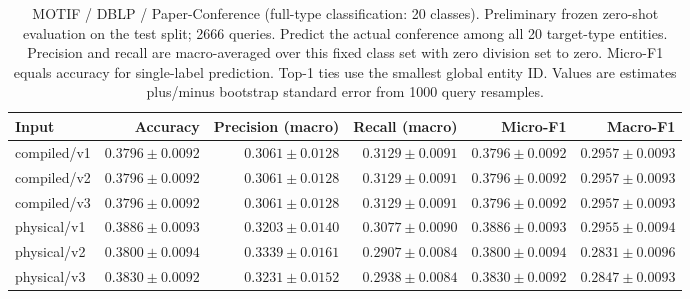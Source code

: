 \begin{table}[t]
\centering
\small
\begin{tabular}{lrrrrr}
\toprule
Input & Accuracy & Precision (macro) & Recall (macro) & Micro-F1 & Macro-F1 \\
\midrule
compiled/v1 & $0.3796 \pm 0.0092$ & $0.3061 \pm 0.0128$ & $0.3129 \pm 0.0091$ & $0.3796 \pm 0.0092$ & $0.2957 \pm 0.0093$ \\
compiled/v2 & $0.3796 \pm 0.0092$ & $0.3061 \pm 0.0128$ & $0.3129 \pm 0.0091$ & $0.3796 \pm 0.0092$ & $0.2957 \pm 0.0093$ \\
compiled/v3 & $0.3796 \pm 0.0092$ & $0.3061 \pm 0.0128$ & $0.3129 \pm 0.0091$ & $0.3796 \pm 0.0092$ & $0.2957 \pm 0.0093$ \\
physical/v1 & $0.3886 \pm 0.0093$ & $0.3203 \pm 0.0140$ & $0.3077 \pm 0.0090$ & $0.3886 \pm 0.0093$ & $0.2955 \pm 0.0094$ \\
physical/v2 & $0.3800 \pm 0.0094$ & $0.3339 \pm 0.0161$ & $0.2907 \pm 0.0084$ & $0.3800 \pm 0.0094$ & $0.2831 \pm 0.0096$ \\
physical/v3 & $0.3830 \pm 0.0092$ & $0.3231 \pm 0.0152$ & $0.2938 \pm 0.0084$ & $0.3830 \pm 0.0092$ & $0.2847 \pm 0.0093$ \\
\bottomrule
\end{tabular}
\caption{MOTIF / DBLP / Paper-Conference (full-type classification: 20 classes). Preliminary frozen zero-shot evaluation on the test split; 2666 queries. Predict the actual conference among all 20 target-type entities. Precision and recall are macro-averaged over this fixed class set with zero division set to zero. Micro-F1 equals accuracy for single-label prediction. Top-1 ties use the smallest global entity ID. Values are estimates plus/minus bootstrap standard error from 1000 query resamples.}
\label{tab:motif-paper_conference-classification}
\end{table}
